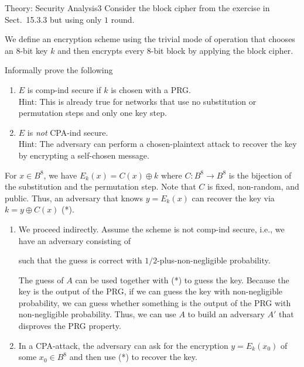 \documentclass[a4paper]{article}
\begin{document}
\begin{problem}{Theory: Security Analysis}{3}
Consider the block cipher from the exercise in Sect.~15.3.3 but using only $1$ round.

We define an encryption scheme using the trivial mode of operation that chooses an $8$-bit key $k$ and then encrypts every $8$-bit block by applying the block cipher.

Informally prove the following
\begin{enumerate}
  \item $E$ is comp-ind secure if $k$ is chosen with a PRG.\\
    Hint: This is already true for networks that use no substitution or permutation steps and only one key step.
  \item $E$ is \emph{not} CPA-ind secure.\\
   Hint: The adversary can perform a chosen-plaintext attack to recover the key by encrypting a self-chosen message.
\end{enumerate}

\begin{solution}
For $x\in B^8$, we have $E_k(x)=C(x)\oplus k$ where $C:B^8\to B^8$ is the bijection of the substitution and the permutation step.
Note that $C$ is fixed, non-random, and public.
Thus, an adversary that knows $y=E_k(x)$ can recover the key via $k=y\oplus C(x)$ (*).

\begin{enumerate}
\item We proceed indirectly.
Assume the scheme is not comp-ind secure, i.e., we have an adversary consisting of
such that the guess is correct with $1/2$-plus-non-negligible probability.

The guess of $A$ can be used together with (*) to guess the key.
Because the key is the output of the PRG, if we can guess the key with non-negligible probability, we can guess whether something is the output of the PRG with non-negligible probability.
Thus, we can use $A$ to build an adversary $A'$ that disproves the PRG property.

\item In a CPA-attack, the adversary can ask for the encryption $y=E_k(x_0)$ of some $x_0\in B^8$ and then use (*) to recover the key.
\end{enumerate}
\end{solution}
\end{problem}
\end{document}
